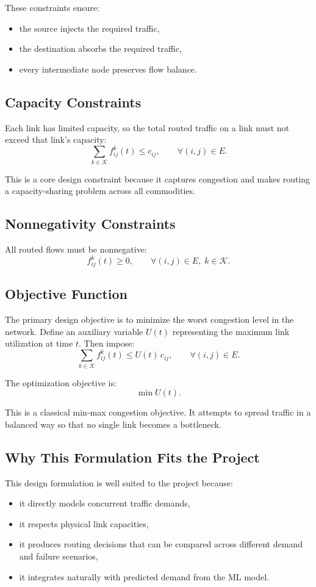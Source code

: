 \documentclass[11pt]{article}
\begin{document}
These constraints ensure:
\begin{itemize}
    \item the source injects the required traffic,
    \item the destination absorbs the required traffic,
    \item every intermediate node preserves flow balance.
\end{itemize}

\subsection{Capacity Constraints}
Each link has limited capacity, so the total routed traffic on a link must not exceed that link's capacity:
\[
\sum_{k \in \mathcal{K}} f_{ij}^{k}(t) \le c_{ij}, \qquad \forall (i,j)\in E.
\]

This is a core design constraint because it captures congestion and makes routing a capacity-sharing problem across all commodities.

\subsection{Nonnegativity Constraints}
All routed flows must be nonnegative:
\[
f_{ij}^{k}(t) \ge 0, \qquad \forall (i,j)\in E, \; k\in\mathcal{K}.
\]

\subsection{Objective Function}
The primary design objective is to minimize the worst congestion level in the network. Define an auxiliary variable $U(t)$ representing the maximum link utilization at time $t$. Then impose:
\[
\sum_{k \in \mathcal{K}} f_{ij}^{k}(t) \le U(t)\, c_{ij}, \qquad \forall (i,j)\in E.
\]

The optimization objective is:
\[
\min U(t).
\]

This is a classical min-max congestion objective. It attempts to spread traffic in a balanced way so that no single link becomes a bottleneck.

\subsection{Why This Formulation Fits the Project}
This design formulation is well suited to the project because:
\begin{itemize}
    \item it directly models concurrent traffic demands,
    \item it respects physical link capacities,
    \item it produces routing decisions that can be compared across different demand and failure scenarios,
    \item it integrates naturally with predicted demand from the ML model.
\end{itemize}
\end{document}
